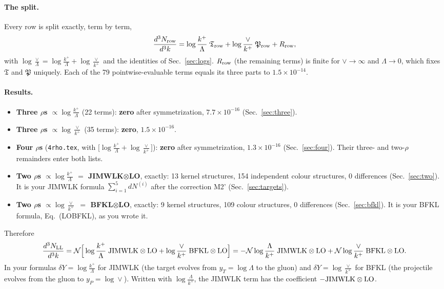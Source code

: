 \documentclass[10pt]{article}
\numberwithin{equation}{section}
\begin{document}
\paragraph{The split.} Every row is split exactly, term by term,
\begin{equation}
\frac{d^3N_{\rm row}}{d^3k}=\log\frac{k^+}{\Lambda}\;\mathfrak T_{\rm row}+\log\frac{\vee}{k^+}\;\mathfrak P_{\rm row}+R_{\rm row},
\label{eq:split}
\end{equation}
with $\log\frac{\vee}{\Lambda}=\log\frac{k^+}{\Lambda}+\log\frac{\vee}{k^+}$ and the identities of Sec.~\ref{sec:logs}. $R_{\rm row}$ (the remaining terms) is finite for $\vee\to\infty$ and $\Lambda\to0$, which fixes $\mathfrak T$ and $\mathfrak P$ uniquely. Each of the 79 pointwise-evaluable terms equals its three parts to $1.5\times10^{-14}$.
\paragraph{Results.}
\begin{itemize}
\item \textbf{Three $\rho$\textquotesingle s $\propto\log\frac{k^+}{\Lambda}$} (22 terms): \textbf{zero} after symmetrization, $7.7\times10^{-16}$ (Sec.~\ref{sec:three}).
\item \textbf{Three $\rho$\textquotesingle s $\propto\log\frac{\vee}{k^+}$} (35 terms): \textbf{zero}, $1.5\times10^{-16}$.
\item \textbf{Four $\rho$\textquotesingle s} (\texttt{4rho.tex}, with $\big[\log\frac{k^+}{\Lambda}+\log\frac{\vee}{k^+}\big]$): \textbf{zero} after symmetrization, $1.3\times10^{-16}$ (Sec.~\ref{sec:four}). Their three- and two-$\rho$ remainders enter both lists.
\item \textbf{Two $\rho$\textquotesingle s $\propto\log\frac{k^+}{\Lambda}$ $=$ JIMWLK$\otimes$LO}, exactly: 13 kernel structures, 154 independent colour structures, 0 differences (Sec.~\ref{sec:two}). It is your JIMWLK formula $\sum_{i=1}^5dN^{(i)}$ after the correction M2' (Sec.~\ref{sec:targets}).
\item \textbf{Two $\rho$\textquotesingle s $\propto\log\frac{\vee}{k^+}$ $=$ BFKL$\otimes$LO}, exactly: 9 kernel structures, 109 colour structures, 0 differences (Sec.~\ref{sec:bfkl}). It is your BFKL formula, Eq.~(LOBFKL), as you wrote it.
\end{itemize}
Therefore
\begin{equation}
\frac{d^3N_{\rm LL}}{d^3k}=\mathcal N\Big[\log\frac{k^+}{\Lambda}\;{\rm JIMWLK}\otimes{\rm LO}+\log\frac{\vee}{k^+}\;{\rm BFKL}\otimes{\rm LO}\Big]
=-\mathcal N\log\frac{\Lambda}{k^+}\;{\rm JIMWLK}\otimes{\rm LO}+\mathcal N\log\frac{\vee}{k^+}\;{\rm BFKL}\otimes{\rm LO}.
\label{eq:LL}
\end{equation}
In your formulas $\delta Y=\log\frac{k^+}{\Lambda}$ for JIMWLK (the target evolves from $y_T=\log\Lambda$ to the gluon) and $\delta Y=\log\frac{\vee}{k^+}$ for BFKL (the projectile evolves from the gluon to $y_P=\log\vee$). Written with $\log\frac{\Lambda}{k^+}$, the JIMWLK term has the coefficient $-{\rm JIMWLK}\otimes{\rm LO}$.
\end{document}
